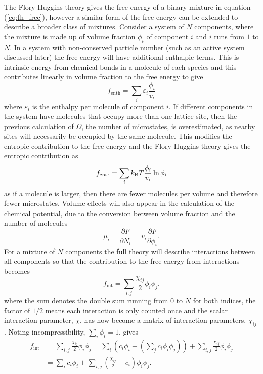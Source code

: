The Flory-Huggins theory gives the free energy of a binary mixture in equation (\ref{eq:fh_free}), however a similar form of the free energy can be extended to describe a broader class of mixtures. Consider a system of $N$ components, where the mixture is made up of volume fraction $\phi_i$ of component $i$ and $i$ runs from $1$ to $N$. In a system with non-conserved particle number (such as an active system discussed later) the free energy will have additional enthalpic terms. This is intrinsic energy from chemical bonds in a molecule of each species and this contributes linearly in volume fraction to the free energy to give
\begin{equation}
    f_\text{enth} = \sum_{i}\varepsilon_i \frac{\phi_i}{v_i}
\end{equation}
where $\varepsilon_i$ is the enthalpy per molecule of component $i$. If different components in the system have molecules that occupy more than one lattice site, then the previous calculation of $\Omega$, the number of microstates, is overestimated, as nearby sites will necessarily be occupied by the same molecule. This modifies the entropic contribution to the free energy and the Flory-Huggins theory gives the entropic contribution as
\begin{equation}
    f_\text{entr} = \sum_{i}k_{\rm B} T \frac{\phi_i}{v_i}\ln\phi_i
\end{equation}
as if a molecule is larger, then there are fewer molecules per volume and therefore fewer microstates. Volume effects will also appear in the calculation of the chemical potential, due to the conversion between volume fraction and the number of molecules
\begin{equation}
    \mu_i = \frac{\partial F}{\partial N_i} = v_i\frac{\partial F}{\partial \phi_i}.
\end{equation}
For a mixture of $N$ components the full theory will describe interactions between all components so that the contribution to the free energy from interactions becomes
\begin{equation}
    f_\text{int} = \sum_{i, j}\frac{\chi_{ij}}{2}\phi_i\phi_j.
\end{equation}
where the sum denotes the double sum running from $0$ to $N$ for both indices, the factor of $1/2$ means each interaction is only counted once and the scalar interaction parameter, $\chi$, has now become a matrix of interaction parameters, $\chi_{ij}$ \cite{mao_phase_2019}. Noting incompressibility, $\sum_{i}\phi_i = 1$, gives
\begin{equation}
\begin{split}
    f_\text{int} &= \sum_{i, j}\frac{\chi_{ij}}{2}\phi_i\phi_j = \sum_{i}\left(c_i\phi_i-\left(\sum_j c_i\phi_i\phi_j\right)\right) + \sum_{i, j}\frac{\chi_{ij}}{2}\phi_i\phi_j \\
    &= \sum_{i}c_i\phi_i + \sum_{i,j}\left(\frac{\chi_{ij}}{2}-c_i\right)\phi_i\phi_j.
\end{split}
\end{equation}
